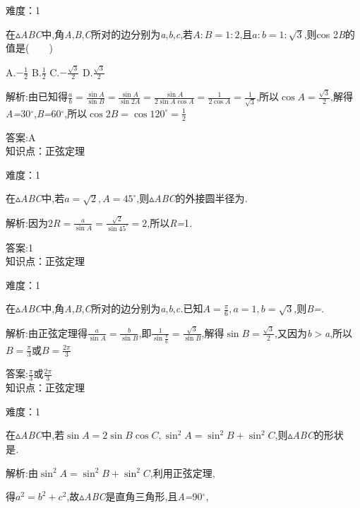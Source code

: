 \documentclass{article} %
\begin{document}
难度：1

 在$\mathrm{\vartriangle}$\textit{ABC}中,角\textit{A},\textit{B},\textit{C}所对的边分别为\textit{a},\textit{b},\textit{c},若$A:B=1:2$,且$a:b=1:\sqrt{3}$,则cos 2\textit{B}的值是(\textit{　　})

 A.$-\frac{1}{2}$ B.$\frac{1}{2}$ C.$-\frac{\sqrt{3}}{2}$ D.$\frac{\sqrt{3}}{2}$

 解析:由已知得$\frac{a}{b}=\frac{\sin A}{\sin B}=\frac{\sin A}{\sin 2A}=\frac{\sin A}{2\sin A\cos A}=\frac{1}{2\cos A}=\frac{1}{\sqrt{3}}$,所以$\cos A=\frac{\sqrt{3}}{2}$,解得\textit{A=}30$\mathrm{{}^\circ}$,\textit{B=}60$\mathrm{{}^\circ}$,所以$\cos 2B=\cos 120^{\circ}=\frac{1}{2}$

 答案:A \\

知识点：正弦定理

难度：1

 在$\mathrm{\vartriangle}$\textit{ABC}中,若$a=\sqrt{2},A=45^{\circ}$,则$\mathrm{\vartriangle}$\textit{ABC}的外接圆半径为\textit{\underbar{　　　　　}.~}

 解析:因为$2R=\frac{a}{\sin A}=\frac{\sqrt{2}}{\sin 45^{\circ}}=2$,所以\textit{R=}1\textit{.}

 答案:1 \\

知识点：正弦定理

难度：1

 在$\mathrm{\vartriangle}$\textit{ABC}中,角\textit{A},\textit{B},\textit{C}所对的边分别为\textit{a},\textit{b},\textit{c.}已知$A=\frac{\pi}{6},a=1,b=\sqrt{3}$,则\textit{B=\underbar{　　　　　}.~}

 解析:由正弦定理得$\frac{a}{\sin A}=\frac{b}{\sin B}$,即$\frac{1}{\sin \frac{\pi}{6}}=\frac{\sqrt{3}}{\sin B}$,解得$\sin B=\frac{\sqrt{3}}{2}$,又因为\textit{b$>$a},所以$B=\frac{\pi}{3}$或$B=\frac{2\pi}{3}$

 答案:$\frac{\pi}{3}$或$\frac{2\pi}{3}$ \\

知识点：正弦定理

难度：1

 在$\mathrm{\vartriangle}$\textit{ABC}中,若$\sin A=2\sin B\cos C,\sin^2 A=\sin^2 B+\sin^2 C$,则$\mathrm{\vartriangle}$\textit{ABC}的形状是\textit{\underbar{　　　　　}.~}

 解析:由$\sin^2 A=\sin^2 B+\sin^2 C$,利用正弦定理,

得$a^2=b^2+c^2$,故$\mathrm{\vartriangle}$\textit{ABC}是直角三角形,且\textit{A=}90$\mathrm{{}^\circ}$,
\end{document}
